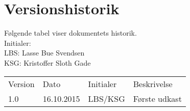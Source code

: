 \documentclass[pdftex, 11pt, a4paper, twoside, danish]{memoir}
\begin{document}
    \begin{titlingpage}
%        
    \end{titlingpage}
    
    \begingroup
        \hypersetup{linkcolor=black}
        \tableofcontents*	%
    \endgroup
    
    \section*{Versionshistorik}
    Følgende tabel viser dokumentets historik.\\    
    Initialer:\\
    LBS: Lasse Bue Svendsen\\
    KSG: Kristoffer Sloth Gade\\
    \begin{center}
    	\begin{tabular}{llll}
    		\rowcolor{grey} Version	& Dato 		& Initialer & Beskrivelse \\
    		\rowcolor{lightgrey}1.0	 & 16.10.2015 	& LBS/KSG	& Første udkast\\
    	\end{tabular}
    \end{center}
    
    
    
       
    
    
    
    
    


    
    \listoftodos
\end{document}
